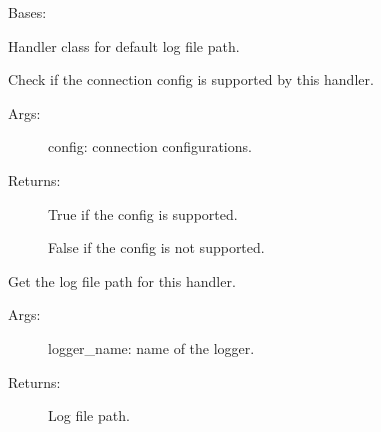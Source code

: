 \documentclass[letterpaper,10pt,english]{sphinxmanual}
\begin{document}

\begin{fulllineitems}
\label{\detokenize{QConnectionLibrary:QConnectionLibrary.qlogger.QDefaultFileHandler}}
\sphinxAtStartPar
Bases: 

\sphinxAtStartPar
Handler class for default log file path.

\begin{fulllineitems}
\label{\detokenize{QConnectionLibrary:QConnectionLibrary.qlogger.QDefaultFileHandler.get_config_supported}}
\sphinxAtStartPar
Check if the connection config is supported by this handler.
\begin{description}
\item[{Args:}] \leavevmode
\sphinxAtStartPar
config: connection configurations.

\item[{Returns:}] \leavevmode
\sphinxAtStartPar
True if the config is supported.

\sphinxAtStartPar
False if the config is not supported.

\end{description}

\end{fulllineitems}


\begin{fulllineitems}
\label{\detokenize{QConnectionLibrary:QConnectionLibrary.qlogger.QDefaultFileHandler.get_log_path}}
\sphinxAtStartPar
Get the log file path for this handler.
\begin{description}
\item[{Args:}] \leavevmode
\sphinxAtStartPar
logger\_name: name of the logger.

\item[{Returns:}] \leavevmode
\sphinxAtStartPar
Log file path.

\end{description}

\end{fulllineitems}


\end{fulllineitems}
\end{document}
